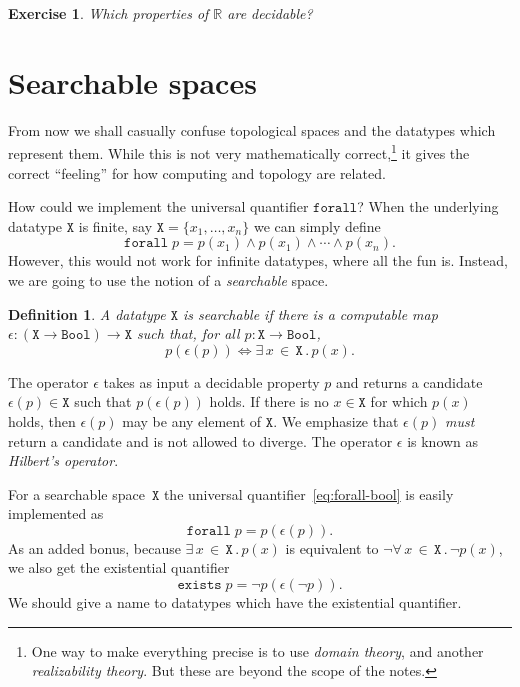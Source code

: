 \documentclass[a4paper,11pt]{article}
\newtheorem{exercise}[theorem]{Exercise}
\newtheorem{definition}[theorem]{Definition}
\newcommand{\RR}{\mathbb{R}}
\newcommand{\set}[1]{\{#1\}}
\newcommand{\Bool}{\mathtt{Bool}}
\newcommand{\xall}[3]{\forall\, #1 \,{\in}\, #2\,.\,#3}
\newcommand{\xsome}[3]{\exists\, #1 \,{\in}\, #2\,.\,#3}
\begin{document}
\begin{exercise}
  Which properties of $\RR$ are decidable?
\end{exercise}

\section{Searchable spaces}
\label{sec:searchable-spaces}

From now we shall casually confuse topological spaces and the
datatypes which represent them. While this is not very mathematically
correct,\footnote{One way to make everything precise is to use
  \emph{domain theory}, and another \emph{realizability theory}. But
  these are beyond the scope of the notes.} it gives the correct
``feeling'' for how computing and topology are related.

How could we implement the universal quantifier $\mathtt{forall}$?
When the underlying datatype $\mathtt{X}$ is finite, say $\mathtt{X} =
\set{x_1, \ldots, x_n}$ we can simply define
%
\begin{equation*}
  \mathtt{forall}\; p = p(x_1) \land p(x_1) \land \cdots \land p(x_n).
\end{equation*}
%
However, this would not work for infinite datatypes, where all the fun
is. Instead, we are going to use the notion of a \emph{searchable} space.

\begin{definition}
  A datatype $\mathtt{X}$ is \emph{searchable} if there is a
  computable map $\epsilon : (\mathtt{X} \to \Bool) \to \mathtt{X}$
  such that, for all $p : \mathtt{X} \to \Bool$,
  \begin{equation*}
    p (\epsilon(p)) \iff \xsome{x}{\mathtt{X}}{p(x)}.
  \end{equation*}
\end{definition}

The operator $\epsilon$ takes as input a decidable property $p$ and
returns a candidate $\epsilon(p) \in \mathtt{X}$ such that
$p(\epsilon(p))$ holds. If there is no $x \in \mathtt{X}$ for which
$p(x)$ holds, then $\epsilon(p)$ may be any element of $\mathtt{X}$.
We emphasize that $\epsilon(p)$ \emph{must} return a candidate and is
not allowed to diverge. The operator $\epsilon$ is known as
\emph{Hilbert's operator}.

For a searchable space~$\mathtt{X}$ the universal
quantifier~\eqref{eq:forall-bool} is easily implemented as
%
\begin{equation*}
  \mathtt{forall} \; p = p (\epsilon(p)).
\end{equation*}
%
As an added bonus, because $\xsome{x}{\mathtt{X}}{p(x)}$ is equivalent
to $\lnot\xall{x}{\mathtt{X}}{\lnot p(x)}$, we also get the
existential quantifier
%
\begin{equation*}
  \mathtt{exists} \; p = \lnot p(\epsilon (\lnot p)).
\end{equation*}
%
We should give a name to datatypes which have the existential
quantifier.
\end{document}
